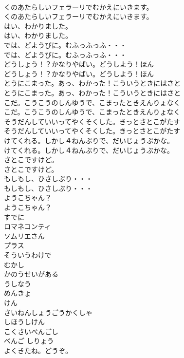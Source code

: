 \documentclass[8pt]{extreport}
\begin{document}
\begin{CJK}{UTF8}{min}
\\	くのあたらしいフェラーリでむかえにいきます。	
\\	くのあたらしいフェラーリでむかえにいきます。 
\\	はい、わかりました。	
\\	はい、わかりました。 
\\	では、どようびに。むふっふっふ・・・	
\\	では、どようびに。むふっふっふ・・・ 
\\	どうしょう！？かなりやばい。どうしよう！ほん	
\\	どうしょう！？かなりやばい。どうしよう！ほん 
\\	とうにこまった。あっ、わかった！こういうときにはさと	
\\	とうにこまった。あっ、わかった！こういうときにはさと 
\\	こだ。こうこうのしんゆうで、こまったときえんりょなく	
\\	こだ。こうこうのしんゆうで、こまったときえんりょなく 
\\	そうだんしていいってやくそくした。きっとさとこがたす	
\\	そうだんしていいってやくそくした。きっとさとこがたす 
\\	けてくれる。しかし４ねんぶりで、だいじょうぶかな。	
\\	けてくれる。しかし４ねんぶりで、だいじょうぶかな。 
\\	さとこですけど。	
\\	さとこですけど。 
\\	もしもし、ひさしぶり・・・	
\\	もしもし、ひさしぶり・・・ 
\\	ようこちゃん？	
\\	ようこちゃん？ 
\\	すでに
\\	ロマネコンティ
\\	ソムリエさん
\\	プラス
\\	そういうわけで
\\	むかし
\\	かのうせいがある
\\	うしなう
\\	めんきょ
\\	けん
\\	さいねんしょうごうかくしゃ
\\	しほうしけん
\\	こくさいべんごし
\\	べんご しりょう
\\	よくきたね。どうぞ。	

\end{CJK}
\end{document}
